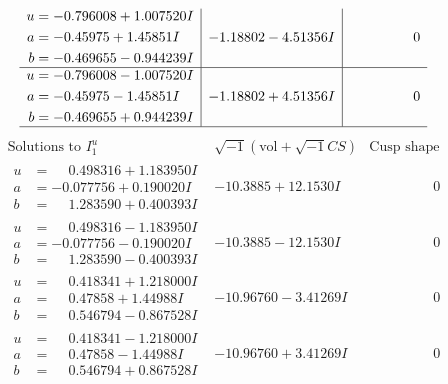 \documentclass[1p]{elsarticle_modified}
\theoremstyle{definition}
\newcommand{\I}{\sqrt{-1}}
\begin{document}
$$\begin{array}{c|c|c}
\begin{aligned}
u &= -0.796008 + 1.007520 I \\
a &= -0.45975 + 1.45851 I \\
b &= -0.469655 - 0.944239 I\end{aligned}
 & -1.18802 - 4.51356 I & \phantom{-0.000000 } 0 \\ \hline\begin{aligned}
u &= -0.796008 - 1.007520 I \\
a &= -0.45975 - 1.45851 I \\
b &= -0.469655 + 0.944239 I\end{aligned}
 & -1.18802 + 4.51356 I & \phantom{-0.000000 } 0\\
 \hline 
 \end{array}$$\newpage$$\begin{array}{c|c|c}  
\text{Solutions to }I^u_{1}& \I (\text{vol} + \sqrt{-1}CS) & \text{Cusp shape}\\
 \hline 
\begin{aligned}
u &= \phantom{-}0.498316 + 1.183950 I \\
a &= -0.077756 + 0.190020 I \\
b &= \phantom{-}1.283590 + 0.400393 I\end{aligned}
 & -10.3885 + 12.1530 I & \phantom{-0.000000 } 0 \\ \hline\begin{aligned}
u &= \phantom{-}0.498316 - 1.183950 I \\
a &= -0.077756 - 0.190020 I \\
b &= \phantom{-}1.283590 - 0.400393 I\end{aligned}
 & -10.3885 - 12.1530 I & \phantom{-0.000000 } 0 \\ \hline\begin{aligned}
u &= \phantom{-}0.418341 + 1.218000 I \\
a &= \phantom{-}0.47858 + 1.44988 I \\
b &= \phantom{-}0.546794 - 0.867528 I\end{aligned}
 & -10.96760 - 3.41269 I & \phantom{-0.000000 } 0 \\ \hline\begin{aligned}
u &= \phantom{-}0.418341 - 1.218000 I \\
a &= \phantom{-}0.47858 - 1.44988 I \\
b &= \phantom{-}0.546794 + 0.867528 I\end{aligned}
 & -10.96760 + 3.41269 I & \phantom{-0.000000 } 0 \\ \hline\begin{aligned}

\end{aligned}
\end{array}$$
\end{document}
